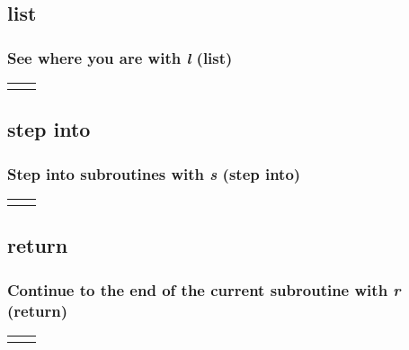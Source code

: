 \subsection{list}
\begin{frame}
\frametitle{See where you are with \textit{\textbf{l}} (list)}
\begin{table}
    \begin{tabular}{p{4.7cm}p{4.7cm}}
        &
        \lstset{basicstyle=\ttfamily\tiny}
        
    \end{tabular} 
\end{table}
\end{frame}

\subsection{step into}
\begin{frame}
\frametitle{Step into subroutines with \textit{\textbf{s}} (step into)}
\begin{table}
    \begin{tabular}{p{4.7cm}p{4.7cm}}
        &
        \lstset{basicstyle=\ttfamily\tiny}
        
    \end{tabular} 
\end{table}
\end{frame}

\subsection{return}
\begin{frame}
\frametitle{Continue to the end of the current subroutine with \textit{\textbf{r}} (return)}
\begin{table}
    \begin{tabular}{p{4.7cm}p{4.7cm}}
        &
        \lstset{basicstyle=\ttfamily\tiny}
        
    \end{tabular} 
\end{table}
\end{frame}

